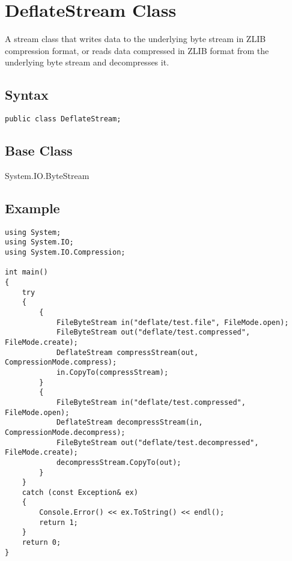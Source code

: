 \documentclass[a4paper,oneside,11.000000pt]{book}
\begin{document}
\hypertarget{System.IO.Compression.DeflateStream}{\section{DeflateStream Class}}
\begin{flushleft}
A stream class that writes data to the underlying byte stream in ZLIB compression format, or reads data compressed in ZLIB format from the underlying byte stream and decompresses it.

\end{flushleft}
\subsection*{Syntax}\texttt{public class DeflateStream;}

\subsection*{Base Class}System.IO.ByteStream
\subsection{Example}
\lstset{frameround=fttt}\begin{lstlisting}[frame=trBL]
using System;
using System.IO;
using System.IO.Compression;

int main()
{
    try
    {
        {
            FileByteStream in("deflate/test.file", FileMode.open);
            FileByteStream out("deflate/test.compressed", FileMode.create);
            DeflateStream compressStream(out, CompressionMode.compress);
            in.CopyTo(compressStream);
        }    
        {
            FileByteStream in("deflate/test.compressed", FileMode.open);
            DeflateStream decompressStream(in, CompressionMode.decompress);
            FileByteStream out("deflate/test.decompressed", FileMode.create);
            decompressStream.CopyTo(out);
        }
    }
    catch (const Exception& ex)
    {
        Console.Error() << ex.ToString() << endl();
        return 1;
    }
    return 0;
}
\end{lstlisting}
\end{document}
